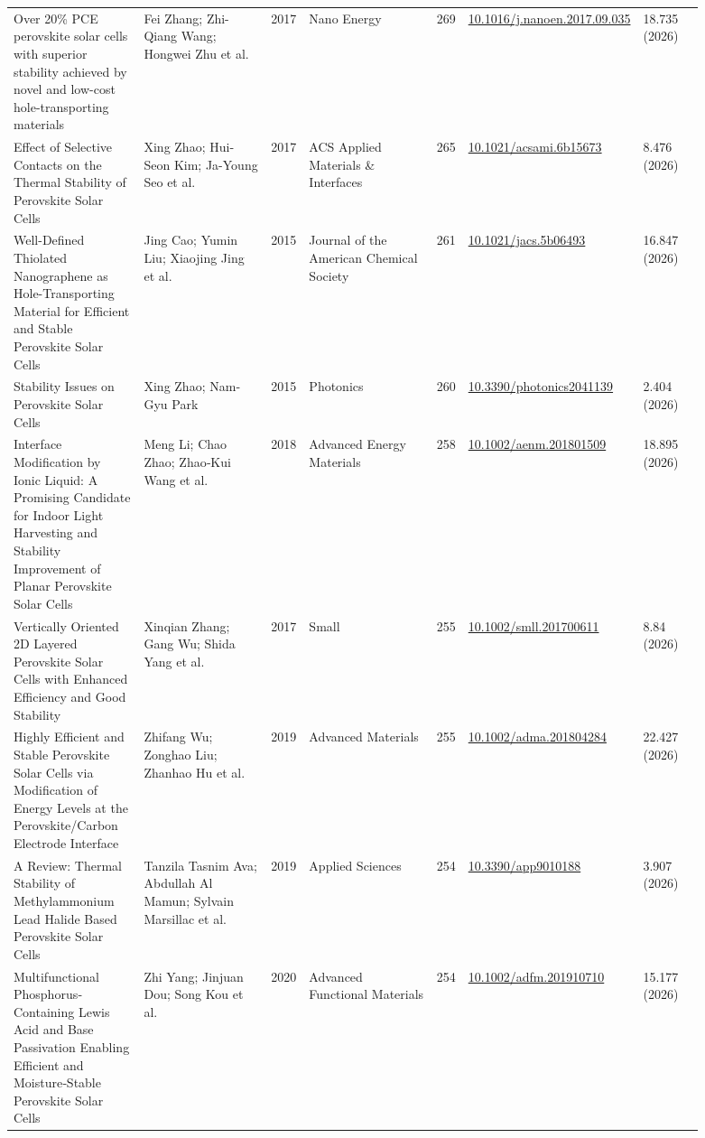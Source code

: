 \documentclass[10pt,a4paper]{article}
\begin{document}
{\begin{longtable}{p{0.197\linewidth}p{0.197\linewidth}p{0.043\linewidth}p{0.197\linewidth}p{0.043\linewidth}p{0.117\linewidth}p{0.098\linewidth}}
Over 20\% PCE perovskite solar cells with superior stability achieved by novel and low-cost hole-transporting materials & Fei Zhang; Zhi-Qiang Wang; Hongwei Zhu et al. & 2017 & Nano Energy & 269 & \href{https://doi.org/10.1016/j.nanoen.2017.09.035}{10.1016/j.nanoen.2017.09.035} & 18.735 (2026) \\
Effect of Selective Contacts on the Thermal Stability of Perovskite Solar Cells & Xing Zhao; Hui‐Seon Kim; Ja-Young Seo et al. & 2017 & ACS Applied Materials \& Interfaces & 265 & \href{https://doi.org/10.1021/acsami.6b15673}{10.1021/acsami.6b15673} & 8.476 (2026) \\
Well-Defined Thiolated Nanographene as Hole-Transporting Material for Efficient and Stable Perovskite Solar Cells & Jing Cao; Yumin Liu; Xiaojing Jing et al. & 2015 & Journal of the American Chemical Society & 261 & \href{https://doi.org/10.1021/jacs.5b06493}{10.1021/jacs.5b06493} & 16.847 (2026) \\
Stability Issues on Perovskite Solar Cells & Xing Zhao; Nam‐Gyu Park & 2015 & Photonics & 260 & \href{https://doi.org/10.3390/photonics2041139}{10.3390/photonics2041139} & 2.404 (2026) \\
Interface Modification by Ionic Liquid: A Promising Candidate for Indoor Light Harvesting and Stability Improvement of Planar Perovskite Solar Cells & Meng Li; Chao Zhao; Zhao‐Kui Wang et al. & 2018 & Advanced Energy Materials & 258 & \href{https://doi.org/10.1002/aenm.201801509}{10.1002/aenm.201801509} & 18.895 (2026) \\
Vertically Oriented 2D Layered Perovskite Solar Cells with Enhanced Efficiency and Good Stability & Xinqian Zhang; Gang Wu; Shida Yang et al. & 2017 & Small & 255 & \href{https://doi.org/10.1002/smll.201700611}{10.1002/smll.201700611} & 8.84 (2026) \\
Highly Efficient and Stable Perovskite Solar Cells via Modification of Energy Levels at the Perovskite/Carbon Electrode Interface & Zhifang Wu; Zonghao Liu; Zhanhao Hu et al. & 2019 & Advanced Materials & 255 & \href{https://doi.org/10.1002/adma.201804284}{10.1002/adma.201804284} & 22.427 (2026) \\
A Review: Thermal Stability of Methylammonium Lead Halide Based Perovskite Solar Cells & Tanzila Tasnim Ava; Abdullah Al Mamun; Sylvain Marsillac et al. & 2019 & Applied Sciences & 254 & \href{https://doi.org/10.3390/app9010188}{10.3390/app9010188} & 3.907 (2026) \\
Multifunctional Phosphorus‐Containing Lewis Acid and Base Passivation Enabling Efficient and Moisture‐Stable Perovskite Solar Cells & Zhi Yang; Jinjuan Dou; Song Kou et al. & 2020 & Advanced Functional Materials & 254 & \href{https://doi.org/10.1002/adfm.201910710}{10.1002/adfm.201910710} & 15.177 (2026) \\

\end{longtable}}
\end{document}
